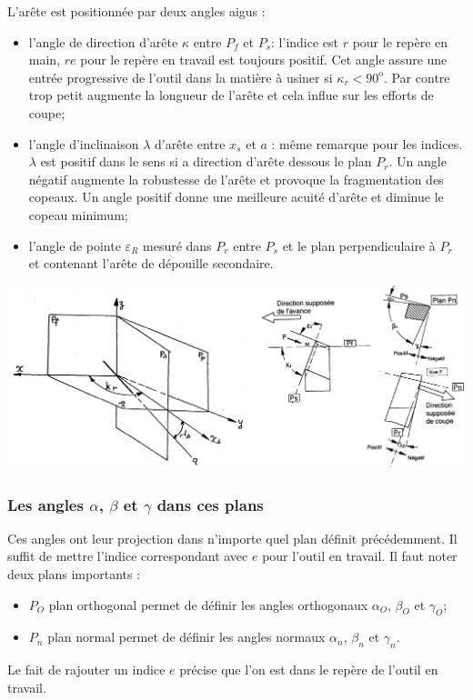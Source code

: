 \documentclass[11pt,oneside]{article}
\begin{document}
L'arête est positionnée par deux angles aigus :
\begin{itemize}
\item l'angle de direction d'arête $\kappa$ entre $P_f$ et $P_s$: l'indice est $r$ pour le repère en main, $re$ pour le repère en travail est toujours positif. Cet angle assure une entrée progressive de l'outil dans la matière à usiner si $\kappa_r < 90^\text{o}$. Par contre  trop petit augmente la longueur de l'arête et cela influe sur les efforts de coupe;
\item l'angle  d'inclinaison $\lambda$ d'arête entre $x_s$ et $a$ : même remarque pour les indices.$\lambda$ est positif dans le sens si a direction d'arête dessous le plan $P_r$. Un angle négatif augmente la robustesse de l'arête et provoque la fragmentation des copeaux. Un angle positif donne une meilleure acuité d'arête et diminue le copeau minimum;
\item l'angle de pointe $\varepsilon_R$ mesuré dans $P_r$ entre $P_s$ et le plan perpendiculaire à $P_r$ et contenant l'arête de dépouille secondaire.
\end{itemize}

\begin{center}
\includegraphics[width=\textwidth]{png/fig_15}
\end{center}


\subsubsection{Les angles $\alpha$, $\beta$ et $\gamma$ dans ces plans}
Ces angles ont leur projection dans n'importe quel plan définit précédemment. Il suffit de mettre l'indice correspondant avec $e$ pour l'outil en travail. Il faut noter deux plans importants :
\begin{itemize}
\item $P_O$ plan orthogonal permet de définir les angles orthogonaux $\alpha_O$, $\beta_O$ et $\gamma_O$; 
\item $P_n$ plan normal permet de définir les angles normaux $\alpha_n$, $\beta_n$ et $\gamma_n$.
\end{itemize}
Le fait de rajouter un indice $e$ précise que l'on est dans le repère de l'outil en travail.
\end{document}
